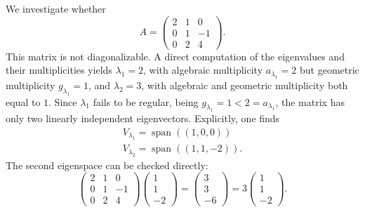 \begin{example}
We investigate whether
\[
A = \begin{pmatrix} 2 & 1 & 0 \\ 0 & 1 & -1 \\ 0 & 2 & 4
\end{pmatrix}.
\]
This matrix is not diagonalizable. A direct computation of the eigenvalues and their multiplicities yields $\lambda_1 = 2$, with algebraic multiplicity $a_{\lambda_1} = 2$ but geometric multiplicity $g_{\lambda_1} = 1$, and $\lambda_2 = 3$, with algebraic and geometric multiplicity both equal to $1$. Since $\lambda_1$ fails to be regular, being $g_{\lambda_1} = 1 < 2 = a_{\lambda_1}$, the matrix has only two linearly independent eigenvectors. Explicitly, one finds
\[
\begin{gathered}
V_{\lambda_1} = \operatorname{span}((1,0,0)) \\
V_{\lambda_2} = \operatorname{span}((1,1,-2)).
\end{gathered}
\]
The second eigenspace can be checked directly:
\[
\begin{pmatrix}2&1&0\\0&1&-1\\0&2&4\end{pmatrix}
\begin{pmatrix}1\\1\\-2\end{pmatrix}
=\begin{pmatrix}3\\3\\-6\end{pmatrix}
=3\begin{pmatrix}1\\1\\-2\end{pmatrix}.
\]

\end{example}

